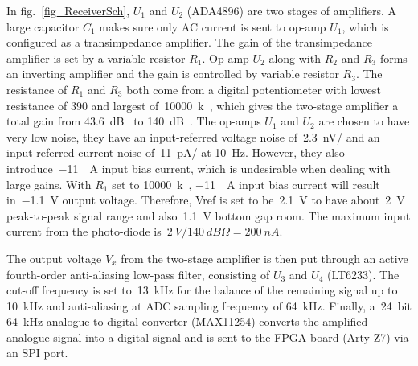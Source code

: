 In fig.~\ref{fig_ReceiverSch}, $U_1$ and $U_2$ (ADA4896) are two stages of amplifiers.  A large capacitor $C_1$ makes sure only AC current is sent to op-amp $U_1$, which is configured as a transimpedance amplifier.  The gain of the transimpedance amplifier is set by a variable resistor $R_1$.  Op-amp $U_2$ along with $R_2$ and $R_3$ forms an inverting amplifier and the gain is controlled by variable resistor $R_3$.  The resistance of $R_1$ and $R_3$ both come from a digital potentiometer with  lowest resistance of \qty{390}{\Omega} and largest of~\qty{10000}{k\Omega}, which gives the two-stage amplifier a total gain from \qty{43.6}{dB\Omega} to \qty{140}{dB\Omega}.  The op-amps $U_1$ and $U_2$ are chosen to have very low noise, they have an input-referred voltage noise of~\qty{2.3}{nV/\sqrthz} and an input-referred current noise of~\qty{11}{pA/\sqrthz} at \qty{10}{\Hz}.  However, they also introduce~\qty{-11}{\mu A} input bias current, which is undesirable when dealing with large gains.  With $R_1$ set to \qty{10000}{k\Omega}, \qty{-11}{\mu A} input bias current will result in~\qty{-1.1}{V} output voltage. Therefore, Vref is set to be~\qty{2.1}{V} to have about~\qty{2}{V} peak-to-peak signal range and also~\qty{1.1}{V} bottom gap room.  The maximum input current from the photo-diode is~$\qty{2}{V}/\qty{140}{dB\Omega}=\qty{200}{nA}$.

The output voltage $V_x$ from the two-stage amplifier is then put through an active fourth-order anti-aliasing low-pass filter, consisting of $U_3$ and $U_4$ (LT6233).  The cut-off frequency is set to~\qty{13}{kHz} for the balance of the remaining signal up to \qty{10}{kHz} and anti-aliasing at ADC sampling frequency of \qty{64}{kHz}. Finally, a~\qty{24}{bit} \qty{64}{kHz} analogue to digital converter (MAX11254) converts the amplified analogue signal into a digital signal and is sent to the FPGA board (Arty Z7) via an SPI port.

